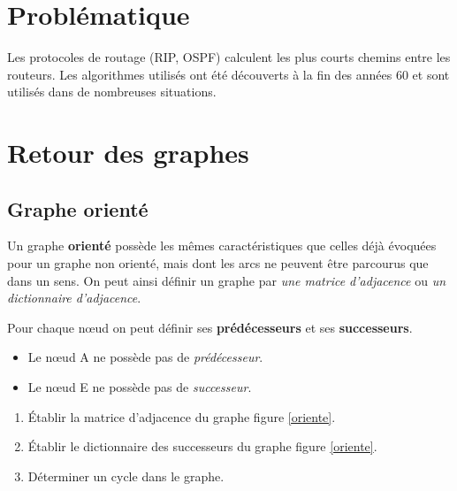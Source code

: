 \documentclass[a4paper,11pt]{article}
\begin{document}
\section{Problématique}
Les protocoles de routage (RIP, OSPF) calculent les plus courts chemins entre les routeurs. Les algorithmes utilisés ont été découverts à la fin des années 60 et sont utilisés dans de nombreuses situations.
\begin{center}
\end{center}
\section{Retour des graphes}
\subsection{Graphe orienté}
Un graphe \textbf{orienté} possède les mêmes caractéristiques que celles déjà évoquées pour un graphe non orienté, mais dont les arcs ne peuvent être parcourus que dans un sens. On peut ainsi définir un graphe par \emph{une matrice d'adjacence} ou \emph{un dictionnaire d'adjacence}.
\begin{center}
    \label{oriente}
\end{center}
\begin{aretenir}[]
    Pour chaque nœud on peut définir ses \textbf{prédécesseurs} et ses \textbf{successeurs}.
    \begin{itemize}
        \item Le nœud A ne possède pas de \emph{prédécesseur}.
        \item Le nœud E ne possède pas de \emph{successeur}.
    \end{itemize}
\end{aretenir}
\begin{activite}
    \begin{enumerate}
        \item Établir la matrice d'adjacence du graphe figure \ref{oriente}.
        \item Établir le dictionnaire des successeurs du graphe figure \ref{oriente}.
        \item Déterminer un cycle dans le graphe.
    \end{enumerate}
\end{activite}
\end{document}
